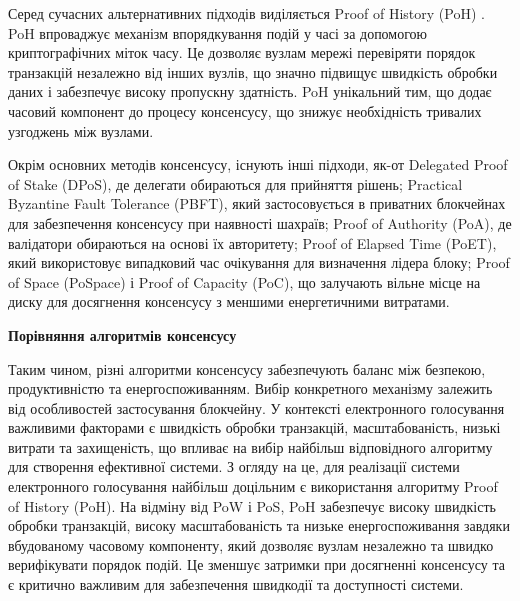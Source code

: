 \documentclass[14pt]{extreport}
\begin{document}
  Серед сучасних альтернативних підходів виділяється Proof of History (PoH) \cite{poh}. PoH впроваджує механізм впорядкування подій у часі за допомогою криптографічних міток часу. Це дозволяє вузлам мережі перевіряти порядок транзакцій незалежно від інших вузлів, що значно підвищує швидкість обробки даних і забезпечує високу пропускну здатність. PoH унікальний тим, що додає часовий компонент до процесу консенсусу, що знижує необхідність тривалих узгоджень між вузлами.

  Окрім основних методів консенсусу, існують інші підходи, як-от Delegated Proof of Stake (DPoS), де делегати обираються для прийняття рішень; Practical Byzantine Fault Tolerance (PBFT), який застосовується в приватних блокчейнах для забезпечення консенсусу при наявності шахраїв; Proof of Authority (PoA), де валідатори обираються на основі їх авторитету; Proof of Elapsed Time (PoET), який використовує випадковий час очікування для визначення лідера блоку; Proof of Space (PoSpace) і Proof of Capacity (PoC), що залучають вільне місце на диску для досягнення консенсусу з меншими енергетичними витратами.

  \begin{table}[H]
  \centering
  \renewcommand{\tablename}{Таблиця}
  \renewcommand{\thetable}{\thechapter.\arabic{table}.}
  \caption{}
  \textbf{Порівняння алгоритмів консенсусу\vspace{5pt}}
  \label{tab:consensus_comparison}
  \end{table}
  
  Таким чином, різні алгоритми консенсусу забезпечують баланс між безпекою, продуктивністю та енергоспоживанням. Вибір конкретного механізму залежить від особливостей застосування блокчейну. У контексті електронного голосування важливими факторами є швидкість обробки транзакцій, масштабованість, низькі витрати та захищеність, що впливає на вибір найбільш відповідного алгоритму для створення ефективної системи. З огляду на це, для реалізації системи електронного голосування найбільш доцільним є використання алгоритму Proof of History (PoH). На відміну від PoW і PoS, PoH забезпечує високу швидкість обробки транзакцій, високу масштабованість та низьке енергоспоживання завдяки вбудованому часовому компоненту, який дозволяє вузлам незалежно та швидко верифікувати порядок подій. Це зменшує затримки при досягненні консенсусу та є критично важливим для забезпечення швидкодії та доступності системи.
  
\end{document}
